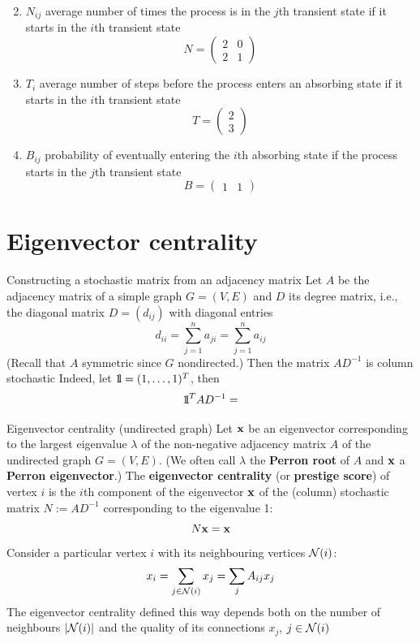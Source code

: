 \documentclass[aspectratio=169]{beamer}
\begin{document}
\begin{frame}
\begin{enumerate}
\setcounter{enumi}{1}
\item $N_{ij}$ average number of times the process is in the $j$th transient state if it starts in the $i$th transient state
\[
N=
\begin{pmatrix}
2 & 0 \\
2 & 1
\end{pmatrix}
\]
\vfill
\item $T_i$ average number of steps before the process enters an absorbing state if it starts in the $i$th transient state
\[
T=\begin{pmatrix}
2\\
3
\end{pmatrix}
\]
\vfill
\item $B_{ij}$ probability of eventually entering the $i$th absorbing state if the process starts in the $j$th transient state
\[
B=
\begin{pmatrix}
	1 & 1
\end{pmatrix}
\]
\end{enumerate}
\vfill
\end{frame}


\section{Eigenvector centrality}

\begin{frame}{Constructing a stochastic matrix from an adjacency matrix}
	Let $A$ be the adjacency matrix of a simple graph $G=(V,E)$ and $D$ its degree matrix, i.e., the diagonal matrix $D=(d_{ij})$ with diagonal entries
	\[
		d_{ii} = \sum_{j=1}^n a_{ji} =\sum_{j=1}^n a_{ij}
	\]
	(Recall that $A$ symmetric since $G$ nondirected.)
	Then the matrix $AD^{-1}$ is column stochastic
	\vfill
	Indeed, let $\nbOne=(1,\ldots,1)^T$, then
	\begin{align*}
		\nbOne^TAD^{-1} = 
	\end{align*}
\end{frame}

\begin{frame}{Eigenvector centrality (undirected graph)}
Let $\mathbf{x}$ be an eigenvector corresponding to the largest eigenvalue $\lambda$ of the non-negative adjacency matrix $A$ of the undirected graph $G = (V, E)$. (We often call $\lambda$ the \textbf{Perron root} of $A$ and $\mathbf{x}$ a \textbf{Perron eigenvector}.)
\vfill
The \textbf{eigenvector centrality} (or \textbf{prestige score}) of vertex $i$ is the $i$th component of the eigenvector $\mathbf{x}$ of the (column) stochastic matrix $N := AD^{-1}$ corresponding to the eigenvalue 1:
\[
	N\mathbf{x} = \mathbf{x}
\]
\vfill
Consider a particular vertex $i$ with its neighbouring vertices $\mathcal{N}(i)$:
\[
	x_i = \sum_{j\in\mathcal{N}(i)} x_j 
	= \sum_j A_{ij} x_j	
\]
\vfill
The eigenvector centrality defined this way depends both on the number of neighbours $|\mathcal{N}(i)|$ and the quality of its connections $x_j$, $j\in\mathcal{N}(i)$
\end{frame}
\end{document}
